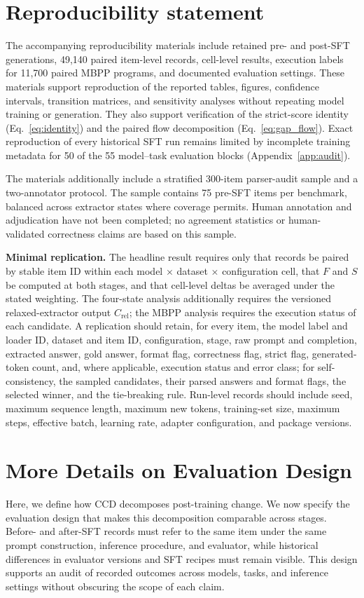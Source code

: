 \documentclass{article}
\newcommand{\Crel}{C_{\mathrm{rel}}}
\begin{document}
\section{Reproducibility statement}
\label{app:reproducibility_statement}
The accompanying reproducibility materials include retained pre- and post-SFT
generations, 49{,}140 paired item-level records, cell-level results, execution
labels for 11{,}700 paired MBPP programs, and documented evaluation settings.
These materials support reproduction of the reported tables, figures,
confidence intervals, transition matrices, and sensitivity analyses without
repeating model training or generation. They also support verification of the
strict-score identity (Eq.~\ref{eq:identity}) and the paired flow decomposition
(Eq.~\ref{eq:gap_flow}). Exact reproduction of every historical SFT run remains
limited by incomplete training metadata for 50 of the 55 model--task evaluation
blocks (Appendix~\ref{app:audit}).

The materials additionally include a stratified 300-item parser-audit sample
and a two-annotator protocol. The sample contains 75 pre-SFT items per benchmark,
balanced across extractor states where coverage permits. Human annotation and
adjudication have not been completed; no agreement statistics or human-validated
correctness claims are based on this sample.

\noindent\textbf{Minimal replication.}
The headline result requires only that records be paired by stable item ID
within each model $\times$ dataset $\times$ configuration cell, that $F$ and
$S$ be computed at both stages, and that cell-level deltas be averaged under
the stated weighting. The four-state analysis additionally requires the
versioned relaxed-extractor output $\Crel$; the MBPP analysis requires the
execution status of each candidate. A replication should retain, for every
item, the model label and loader ID, dataset and item ID, configuration,
stage, raw prompt and completion, extracted answer, gold answer, format flag,
correctness flag, strict flag, generated-token count, and, where applicable,
execution status and error class; for self-consistency, the sampled
candidates, their parsed answers and format flags, the selected winner, and
the tie-breaking rule. Run-level records should include seed, maximum
sequence length, maximum new tokens, training-set size, maximum steps,
effective batch, learning rate, adapter configuration, and package versions.


\section{More Details on Evaluation Design}
\label{app:Evaluation-Design}
Here, we define how CCD decomposes post-training change. We now specify the evaluation design that makes this decomposition comparable across stages. Before- and after-SFT records must refer to the same item under the same prompt construction, inference procedure, and evaluator, while historical differences in evaluator versions and SFT recipes must remain visible. This design supports an audit of recorded outcomes across models, tasks, and inference settings without obscuring the scope of each claim.
\end{document}
